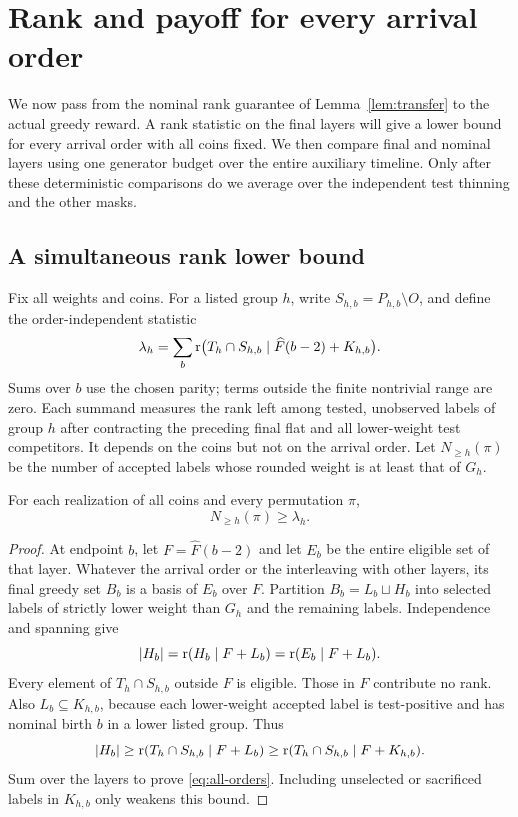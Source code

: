 \section{Rank and payoff for every arrival order}\label{sec:accounting}

We now pass from the nominal rank guarantee of Lemma~\ref{lem:transfer}
to the actual greedy reward. A rank statistic on the final layers will
give a lower bound for every arrival order with all coins fixed. We then
compare final and nominal layers using one generator budget over the
entire auxiliary timeline. Only after these deterministic comparisons do
we average over the independent test thinning and the other masks.

\subsection{A simultaneous rank lower bound}

Fix all weights and coins. For a listed group $h$, write
$S_{h,b}=P_{h,b}\setminus O$, and define the order-independent statistic
\begin{equation}\label{eq:actual-rank-statistic}
 \lambda_h=\sum_b\operatorname{r}\bigl(T_h\cap S_{h,b}\mid
                   \widehat F(b-2)+K_{h,b}\bigr).
\end{equation}
Sums over $b$ use the chosen parity; terms outside the finite nontrivial
range are zero. Each summand measures the rank left among tested,
unobserved labels of group $h$ after contracting the preceding final flat
and all lower-weight test competitors. It depends on the coins but not
on the arrival order. Let $N_{\ge h}(\pi)$ be the number of accepted labels whose
rounded weight is at least that of $G_h$.

\begin{lemma}\label{lem:all-orders}
For each realization of all coins and every permutation $\pi$,
\begin{equation}\label{eq:all-orders}
 N_{\ge h}(\pi)\ge\lambda_h.
\end{equation}
\end{lemma}
\begin{proof}
At endpoint $b$, let $F=\widehat F(b-2)$ and let $E_b$ be the entire
eligible set of that layer. Whatever the arrival order or the interleaving
with other layers, its final greedy set $B_b$ is a basis of $E_b$ over $F$.
Partition $B_b=L_b\sqcup H_b$ into selected labels of strictly lower
weight than $G_h$ and the remaining labels. Independence and spanning give
\[
 |H_b|=\operatorname{r}(H_b\mid F+L_b)=\operatorname{r}(E_b\mid F+L_b).
\]
Every element of $T_h\cap S_{h,b}$ outside $F$ is eligible. Those in $F$
contribute no rank. Also $L_b\subseteq K_{h,b}$, because each lower-weight
accepted label is test-positive and has nominal birth $b$ in a lower
listed group. Thus
\[
 |H_b|\ge\operatorname{r}(T_h\cap S_{h,b}\mid F+L_b)
        \ge\operatorname{r}(T_h\cap S_{h,b}\mid F+K_{h,b}).
\]
Sum over the layers to prove \eqref{eq:all-orders}. Including unselected
or sacrificed labels in $K_{h,b}$ only weakens this bound.
\end{proof}

